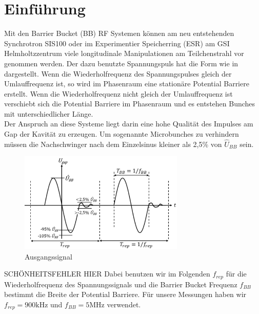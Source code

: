 \documentclass[../Report.tex]{subfiles}
\begin{document}
\chapter{Einführung}
\label{chap:einfuehrung}
Mit den Barrier Bucket (BB) RF Systemen können am neu entstehenden Synchrotron SIS100 oder im Experimentier Speicherring (ESR) am GSI Helmholtzzentrum viele longitudinale Manipulationen am Teilchenstrahl vor genommen werden. Der dazu benutzte Spannungspuls hat die Form wie in  dargestellt. Wenn die Wiederholfrequenz des Spannungspulses gleich der Umlauffrequenz ist, so wird im Phasenraum eine stationäre Potential Barriere erstellt. Wenn die Wiederholfrequenz nicht gleich der Umlauffrequenz ist verschiebt sich die Potential Barriere im Phasenraum und es entstehen Bunches mit unterschiedlicher Länge. \\ Der Anspruch an diese Systeme liegt darin eine hohe Qualität des Impulses am Gap der Kavität zu erzeugen. Um sogenannte Microbunches zu verhindern müssen die Nachschwinger nach dem Einzelsinus kleiner als 2,5\% von $\hat{U}_{BB}$ sein.
\begin{figure}[H]
  \centering
  \includegraphics[width=0.7\textwidth]{images/eps/BB_req.pdf}
  \caption{Ausgangssignal}
  \label{fig:BB_req}
\end{figure}
SCHÖNHEITSFEHLER HIER Dabei benutzen wir im Folgenden $f_{rep}$ für die Wiederholfrequenz des Spannungssignals und die Barrier Bucket Frequenz $f_{BB}$ bestimmt die Breite der Potential Barriere. Für unsere Messungen haben wir ${f_{rep} = 900 \si{\kilo \hertz}}$ und ${f_{BB} = 5 \si{\mega \hertz}}$ verwendet.
\end{document}
